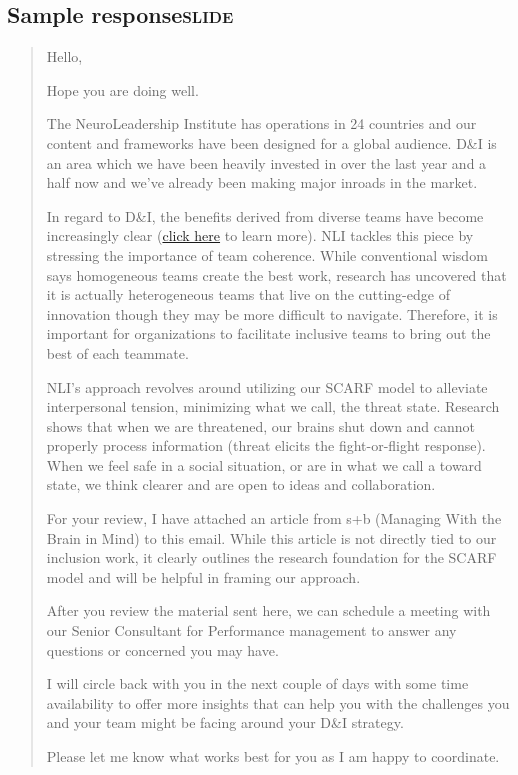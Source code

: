 \documentclass[11pt]{article}
\begin{document}
\subsection{Sample response\hfill{}\textsc{slide}}
\label{sec:orgee3cf6c}

\begin{quote}
Hello,

Hope you are doing well.

The NeuroLeadership Institute has operations in 24 countries and our content and frameworks have been designed for a global audience. D\&I is an area which we have been heavily invested in over the last year and a half now and we've already been making major inroads in the market.

In regard to D\&I, the benefits derived from diverse teams have become
increasingly clear (\href{https://hbr.org/2016/11/why-diverse-teams-are-smarter}{click here} to learn more). NLI tackles this piece by stressing the importance of team coherence. While conventional wisdom says homogeneous teams create the best work, research has uncovered that it is actually heterogeneous teams that live on the cutting-edge of innovation though they may be more difficult to navigate. Therefore, it is important for organizations to facilitate inclusive teams to bring out the best of each teammate.

NLI's approach revolves around utilizing our SCARF model to alleviate interpersonal tension, minimizing what we call, the threat state. Research shows that when we are threatened, our brains shut down and cannot properly process information (threat elicits the fight-or-flight response). When we feel safe in a social situation, or are in what we call a toward state, we think clearer and are open to ideas and collaboration.

For your review, I have attached an article from s+b (Managing With the Brain in Mind) to this email. While this article is not directly tied to our inclusion work, it clearly outlines the research foundation for the SCARF model and will be helpful in framing our approach.

After you review the material sent here, we can schedule a meeting with our Senior Consultant for Performance management to answer any questions or concerned you may have.

I will circle back with you in the next couple of days with some time availability to offer more insights that can help you with the challenges you and your team might be facing around your D\&I strategy.

Please let me know what works best for you as I am happy to coordinate.
\end{quote}
\end{document}
